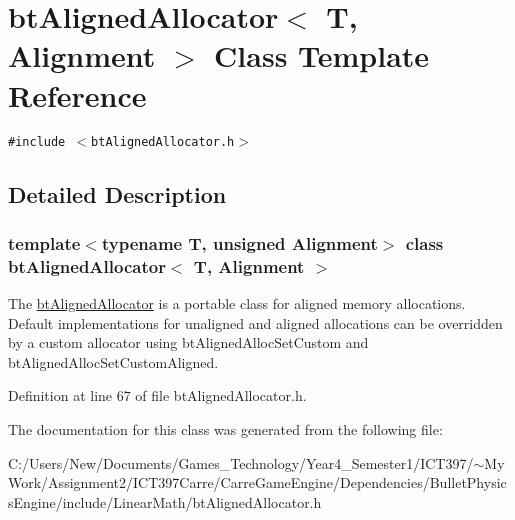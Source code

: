 \hypertarget{classbt_aligned_allocator}{
\section{btAlignedAllocator$<$ T, Alignment $>$ Class Template Reference}
\label{classbt_aligned_allocator}
}
{\tt \#include $<$btAlignedAllocator.h$>$}



\subsection{Detailed Description}
\subsubsection*{template$<$typename T, unsigned Alignment$>$ class btAlignedAllocator$<$ T, Alignment $>$}

The \hyperlink{classbt_aligned_allocator}{btAlignedAllocator} is a portable class for aligned memory allocations. Default implementations for unaligned and aligned allocations can be overridden by a custom allocator using btAlignedAllocSetCustom and btAlignedAllocSetCustomAligned. 

Definition at line 67 of file btAlignedAllocator.h.

The documentation for this class was generated from the following file:\begin{CompactItemize}
\item 
C:/Users/New/Documents/Games\_\-Technology/Year4\_\-Semester1/ICT397/$\sim$My Work/Assignment2/ICT397Carre/CarreGameEngine/Dependencies/BulletPhysicsEngine/include/LinearMath/btAlignedAllocator.h\end{CompactItemize}
